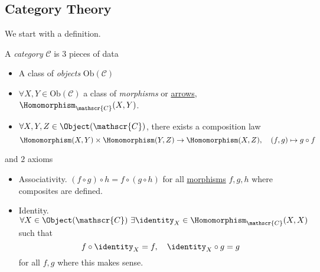 \subsection{Category Theory}
We start with a definition.
\begin{definition}\label{def:category}\label{def:object}\label{def:morphism}
	A \emph{category} \(\mathscr{C} \) is \(3\) pieces of data
	\begin{itemize}
		\item A class of \emph{objects} \(\mathrm{Ob}(\mathscr{C})\)
		\item \(\forall X, Y\in\mathrm{Ob} (\mathscr{C})\) a class of \emph{morphisms} or \underline{arrows},
		      \(\Homomorphism_{\mathscr{C}}(X, Y)\).
		\item \(\forall X, Y, Z\in \Object (\mathscr{C})\), there exists a composition law
		      \[
			      \Homomorphism (X, Y)\times \Homomorphism (Y, Z)\to \Homomorphism (X, Z),\quad (f, g)\mapsto g\circ f
		      \]
	\end{itemize}
	and \(2\) axioms
	\begin{itemize}
		\item Associativity. \((f\circ g)\circ h = f\circ (g\circ h)\) for all \hyperref[def:morphism]{morphisms} \(f, g, h\)
		      where composites are defined.
		\item Identity. \(\forall X\in\Object (\mathscr{C})\ \exists \identity_{X}\in\Homomorphism _{\mathscr{C}} (X, X)\) such that
		      \[
			      f\circ \identity_{X} = f,\quad \identity_{X} \circ g = g
		      \]
		      for all \(f, g\) where this makes sense.
	\end{itemize}
\end{definition}


